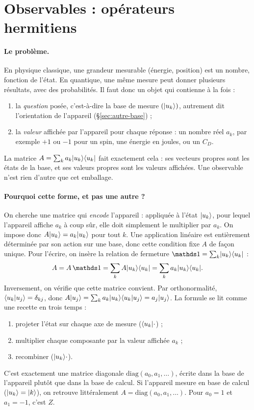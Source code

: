 \section{Observables : opérateurs hermitiens}\label{sec:observables}
\paragraph{Le problème.} En physique classique, une grandeur mesurable (énergie, position) est un nombre, fonction de l'état. En quantique, une même mesure peut donner plusieurs résultats, avec des probabilités. Il faut donc un objet qui contienne à la fois :
\begin{enumerate}
\item la \emph{question} posée, c'est-à-dire la base de mesure $(\lvert u_k\rangle)$, autrement dit l'orientation de l'appareil (§\ref{sec:autre-base}) ;
\item la \emph{valeur} affichée par l'appareil pour chaque réponse : un nombre réel $a_k$, par exemple $+1$ ou $-1$ pour un spin, une énergie en joules, ou un $C_D$.
\end{enumerate}
La matrice $A=\sum_ka_k\lvert u_k\rangle\langle u_k\rvert$ fait exactement cela : ses vecteurs propres sont les états de la base, et ses valeurs propres sont les valeurs affichées. Une observable n'est rien d'autre que cet emballage.

\paragraph{Pourquoi cette forme, et pas une autre ?} On cherche une matrice qui \emph{encode} l'appareil : appliquée à l'état $\lvert u_k\rangle$, pour lequel l'appareil affiche $a_k$ à coup sûr, elle doit simplement le multiplier par $a_k$. On impose donc $A\lvert u_k\rangle=a_k\lvert u_k\rangle$ pour tout $k$. Une application linéaire est entièrement déterminée par son action sur une base, donc cette condition fixe $A$ de façon unique. Pour l'écrire, on insère la relation de fermeture $\Id=\sum_k\ket{u_k}\bra{u_k}$ :
\[
A=A\,\Id=\sum_kA\ket{u_k}\bra{u_k}=\sum_ka_k\ket{u_k}\bra{u_k}.
\]
Inversement, on vérifie que cette matrice convient. Par orthonormalité, $\langle u_k\vert u_j\rangle=\delta_{kj}$, donc $A\lvert u_j\rangle=\sum_ka_k\lvert u_k\rangle\langle u_k\vert u_j\rangle=a_j\lvert u_j\rangle$. La formule se lit comme une recette en trois temps :
\begin{enumerate}
\item projeter l'état sur chaque axe de mesure ($\langle u_k\rvert\cdot$) ;
\item multiplier chaque composante par la valeur affichée $a_k$ ;
\item recombiner ($\lvert u_k\rangle\cdot$).
\end{enumerate}
C'est exactement une matrice diagonale $\mathrm{diag}(a_0,a_1,\dots)$, écrite dans la base de l'appareil plutôt que dans la base de calcul. Si l'appareil mesure en base de calcul ($\lvert u_k\rangle=\lvert k\rangle$), on retrouve littéralement $A=\mathrm{diag}(a_0,a_1,\dots)$. Pour $a_0=1$ et $a_1=-1$, c'est $Z$.

